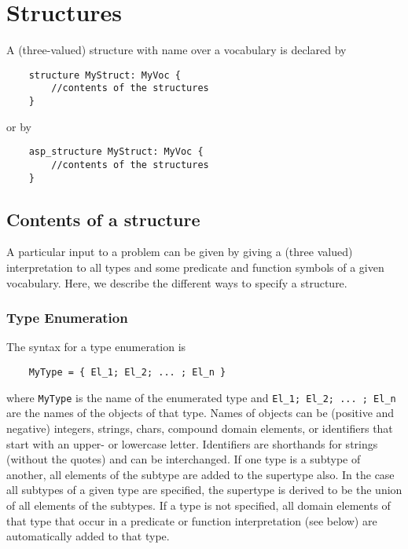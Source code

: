 \documentclass[a4]{article}
\begin{document}
\section{Structures}

A (three-valued) structure with name  over a vocabulary  is declared by
\begin{lstlisting}
	structure MyStruct: MyVoc {
		//contents of the structures
	}
\end{lstlisting}
or by 
\begin{lstlisting}
	asp_structure MyStruct: MyVoc {
		//contents of the structures
	}
\end{lstlisting}

\subsection{Contents of a structure}


A particular input to a problem can be given by giving a (three valued) interpretation to all types and some predicate and function symbols of a given vocabulary. Here, we describe the different ways to specify a structure.

\subsubsection{Type Enumeration}
The syntax for a type enumeration is 
\begin{lstlisting}
	MyType = { El_1; El_2; ... ; El_n }
\end{lstlisting}
where {\tt MyType} is the name of the enumerated type and {\tt El\_1; El\_2; ... ; El\_n } are the names of the objects of that type. Names of objects can be (positive and negative) integers, strings, chars, compound domain elements, or identifiers that start with an upper- or lowercase letter. 
Identifiers are shorthands for strings (without the quotes) and can be interchanged.
If one type is a subtype of another, all elements of the subtype are added to the supertype also.  In the case all subtypes of a given type are specified, the supertype is derived to be the union of all elements of the subtypes.  If a type is not specified, all domain elements of that type that occur in a predicate or function interpretation (see below) are automatically added to that type.  
\end{document}
